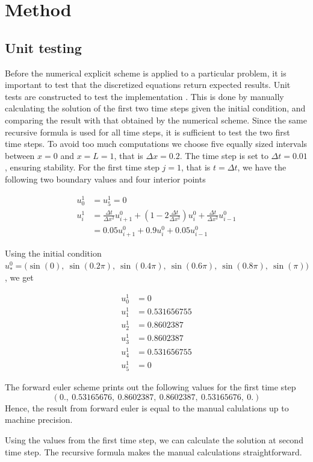 \documentclass[12pt]{extarticle}
\begin{document}
\section{Method}
\subsection*{Unit testing}
Before the numerical explicit scheme is applied to a particular problem, it is important to test that the discretized equations return expected results. Unit tests are constructed to test the implementation . This is done by manually calculating the solution of the first two time steps given the initial condition, and comparing the result with that obtained by the numerical scheme. Since the same recursive formula is used for all time steps, it is sufficient to test the two first time steps. To avoid too much computations we choose five equally sized intervals between $x=0$ and $x=L=1$, that is $\Delta x = 0.2$. The time step is set to $\Delta t = 0.01$, ensuring stability.
For the first time step $j=1$, that is $t=\Delta t$, we have the following two boundary values and four interior points

\begin{align*}
	u_0^1 &= u_5^1 = 0 \\
	u_i^1 &= \frac{\Delta t}{\Delta x^2}u_{i+1}^0 + (1 - 2\frac{\Delta t}{\Delta x^2})u_i^0 + \frac{\Delta t}{\Delta x^2}u_{i-1}^0 \\
	&= 0.05u_{i+1}^0 + 0.9u_i^0 + 0.05u_{i-1}^0
\end{align*}

Using the initial condition $u_*^0 = \big(\sin(0),\:\sin(0.2\pi),\:\sin(0.4\pi),\:\sin(0.6\pi), \:\sin(0.8\pi),\:\sin(\pi)\big)$, we get

\begin{align*}
	u_0^1 &= 0 \\
	u_1^1 &= 0.531656755 \\
	u_2^1 &= 0.8602387 \\
	u_3^1 &= 0.8602387 \\
	u_4^1 &= 0.531656755 \\
	u_5^1 &= 0
\end{align*}

The forward euler scheme prints out the following values for the first time step
\[ (0.,\:         0.53165676,\: 0.8602387,\:  0.8602387,\:  0.53165676,\: 0.        ) \]
Hence, the result from forward euler is equal to the manual calulations up to machine precision.

\par Using the values from the first time step, we can calculate the solution at second time step. The recursive formula makes the manual calculations straightforward.
\end{document}
